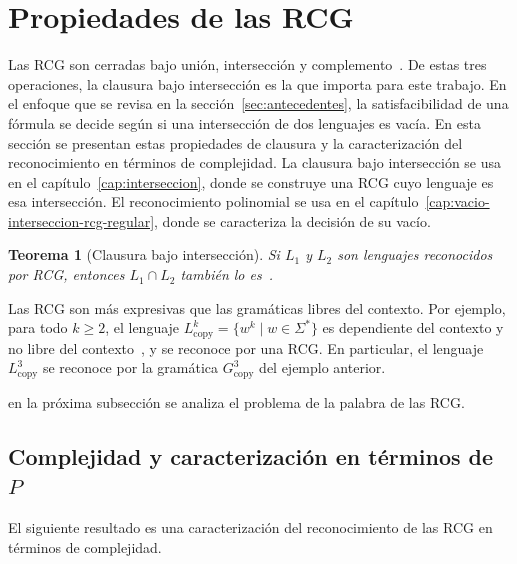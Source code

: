 \documentclass{report}
\theoremstyle{definition}
\theoremstyle{plain}
\newtheorem{teorema}{Teorema}[chapter]
\theoremstyle{remark}
\begin{document}
\section{Propiedades de las RCG}
\label{sec:propiedades-rcg}

Las RCG son cerradas bajo unión, intersección y
complemento~\cite{boullier1998proposal}. De estas tres operaciones, la
clausura bajo intersección es la que importa para este trabajo. En el
enfoque que
se revisa en la sección~\ref{sec:antecedentes}, la satisfacibilidad de
una fórmula se decide según si una intersección de dos lenguajes es
vacía. En esta sección se presentan estas propiedades de clausura y la
caracterización del reconocimiento en términos de complejidad. La
clausura bajo intersección se usa en el capítulo~\ref{cap:interseccion},
donde se construye una RCG cuyo lenguaje es esa intersección. El
reconocimiento polinomial se usa en el
capítulo~\ref{cap:vacio-interseccion-rcg-regular}, donde se caracteriza la
decisión de su vacío.

\begin{teorema}[Clausura bajo intersección]
  \label{teo:clausura-rcg}
  Si $L_1$ y $L_2$ son lenguajes reconocidos por RCG, entonces
  $L_1 \cap L_2$ también lo es~\cite{boullier1998proposal}.
\end{teorema}

Las RCG son más expresivas que las gramáticas libres del contexto. Por
ejemplo, para todo $k \ge 2$, el lenguaje $L_{\mathrm{copy}}^k = \{ w^k
  \mid w \in \Sigma^*\}$ es dependiente del contexto y no libre del
contexto~\cite{hopcroft2006introduction}, y se reconoce por una RCG. En
particular, el lenguaje $L_{\mathrm{copy}}^3$ se reconoce por la
gramática $G_{\mathrm{copy}}^3$ del ejemplo anterior.

 en la próxima subsección se analiza
el problema de la palabra de las RCG.

\subsection{Complejidad y caracterización en términos de $P$}

El siguiente resultado es una caracterización del reconocimiento de las
RCG en términos de complejidad.
\end{document}
